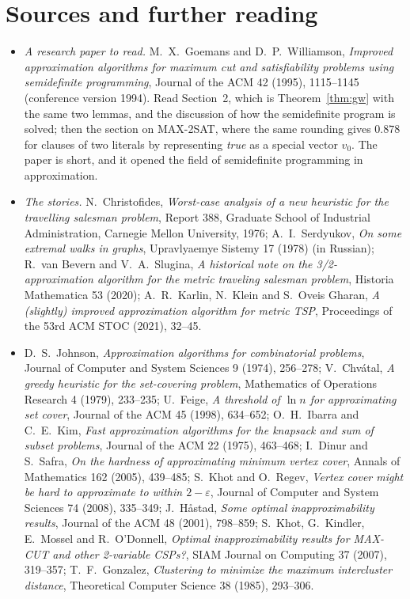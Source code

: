 \section*{Sources and further reading}

\begin{itemize}
\item \emph{A research paper to read.} M.~X.~Goemans and D.~P.~Williamson, \emph{Improved approximation algorithms for maximum cut and satisfiability problems using semidefinite programming}, Journal of the ACM 42 (1995), 1115--1145 (conference version 1994). Read Section~2, which is Theorem~\ref{thm:gw} with the same two lemmas, and the discussion of how the semidefinite program is solved; then the section on MAX-2SAT, where the same rounding gives $0.878$ for clauses of two literals by representing \emph{true} as a special vector $v_0$. The paper is short, and it opened the field of semidefinite programming in approximation.
\item \emph{The stories.} N.~Christofides, \emph{Worst-case analysis of a new heuristic for the travelling salesman problem}, Report 388, Graduate School of Industrial Administration, Carnegie Mellon University, 1976; A.~I.~Serdyukov, \emph{On some extremal walks in graphs}, Upravlyaemye Sistemy 17 (1978) (in Russian); R.~van Bevern and V.~A.~Slugina, \emph{A historical note on the 3/2-approximation algorithm for the metric traveling salesman problem}, Historia Mathematica 53 (2020); A.~R.~Karlin, N.~Klein and S.~Oveis Gharan, \emph{A (slightly) improved approximation algorithm for metric TSP}, Proceedings of the 53rd ACM STOC (2021), 32--45.
\item D.~S.~Johnson, \emph{Approximation algorithms for combinatorial problems}, Journal of Computer and System Sciences 9 (1974), 256--278; V.~Chv\'atal, \emph{A greedy heuristic for the set-covering problem}, Mathematics of Operations Research 4 (1979), 233--235; U.~Feige, \emph{A threshold of $\ln n$ for approximating set cover}, Journal of the ACM 45 (1998), 634--652; O.~H.~Ibarra and C.~E.~Kim, \emph{Fast approximation algorithms for the knapsack and sum of subset problems}, Journal of the ACM 22 (1975), 463--468;
I.~Dinur and S.~Safra, \emph{On the hardness of approximating minimum vertex cover}, Annals of Mathematics 162 (2005), 439--485; S.~Khot and O.~Regev, \emph{Vertex cover might be hard to approximate to within $2-\varepsilon$}, Journal of Computer and System Sciences 74 (2008), 335--349; J.~H\aa stad, \emph{Some optimal inapproximability results}, Journal of the ACM 48 (2001), 798--859; S.~Khot, G.~Kindler, E.~Mossel and R.~O'Donnell, \emph{Optimal inapproximability results for MAX-CUT and other 2-variable CSPs?}, SIAM Journal on Computing 37 (2007), 319--357; T.~F.~Gonzalez, \emph{Clustering to minimize the maximum intercluster distance}, Theoretical Computer Science 38 (1985), 293--306.

\end{itemize}
